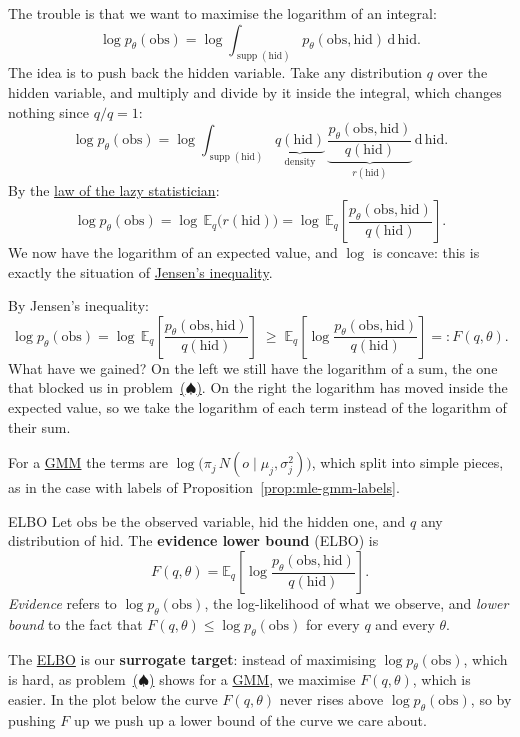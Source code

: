 \documentclass[a4paper,12pt,oneside]{report}
\newcommand{\spadeproblem}{\hyperref[box:spade]{($\spadesuit$)}}
\begin{document}
The trouble is that we want to maximise the logarithm of an integral:
\[
\log p_\theta(\text{obs})=\log\int_{\operatorname{supp}(\text{hid})}
p_\theta(\text{obs},\text{hid})\,\mathrm{d}\,\text{hid}.
\]
The idea is to push back the hidden variable. Take any distribution $q$ over
the hidden variable, and multiply and divide by it inside the integral, which
changes nothing since $q/q=1$:
\[
\log p_\theta(\text{obs})=\log\int_{\operatorname{supp}(\text{hid})}
\underbrace{q(\text{hid})}_{\text{density}}\,
\underbrace{\frac{p_\theta(\text{obs},\text{hid})}{q(\text{hid})}}_{r(\text{hid})}\,
\mathrm{d}\,\text{hid}.
\]
By the \hyperref[thm:lazy]{law of the lazy statistician}:
\[
\log p_\theta(\text{obs})=\log\,\mathbb{E}_q\big(r(\text{hid})\big)
=\log\,\mathbb{E}_q\!\left[\frac{p_\theta(\text{obs},\text{hid})}{q(\text{hid})}\right].
\] We now have the logarithm of an
expected value, and $\log$ is concave: this is exactly the situation of
\hyperref[thm:jensen]{Jensen's inequality}.

By Jensen's inequality:
\[
\log p_\theta(\text{obs})=\log\,\mathbb{E}_q\!\left[\frac{p_\theta(\text{obs},\text{hid})}{q(\text{hid})}\right]
\;\ge\;\mathbb{E}_q\!\left[\log\frac{p_\theta(\text{obs},\text{hid})}{q(\text{hid})}\right]
=:F(q,\theta).
\]
What have we gained? On the left we still have the logarithm of a sum, the
one that blocked us in problem~\spadeproblem. On the right the logarithm has
moved inside the expected value, so we take the logarithm of each term
instead of the logarithm of their sum.

For a \hyperref[def:gmm]{GMM} the
terms are $\log\big(\pi_j\,N(o\mid\mu_j,\sigma_j^2)\big)$, which
split into simple pieces, as in the case with labels of
Proposition~\ref{prop:mle-gmm-labels}.

\begin{frameddefn}{ELBO}\label{def:elbo}
Let $\text{obs}$ be the observed variable, $\text{hid}$ the hidden one, and $q$ any
distribution of $\text{hid}$. The \textbf{evidence lower bound} (ELBO) is
\[
F(q,\theta)=\mathbb{E}_q\!\left[\log\frac{p_\theta(\text{obs},\text{hid})}{q(\text{hid})}\right].
\]
\emph{Evidence} refers to $\log p_\theta(\text{obs})$, the log-likelihood of what we
observe, and \emph{lower bound} to the fact that
$F(q,\theta)\le\log p_\theta(\text{obs})$ for every $q$ and every $\theta$.
\end{frameddefn}

The \hyperref[def:elbo]{ELBO} is our \textbf{surrogate target}: instead of maximising
$\log p_\theta(\text{obs})$, which is hard, as problem~\spadeproblem{} shows for a
\hyperref[def:gmm]{GMM}, we maximise $F(q,\theta)$, which is
easier. In the plot below the curve $F(q,\theta)$ never rises above
$\log p_\theta(\text{obs})$, so by pushing $F$ up we push up a lower bound of the
curve we care about.
\end{document}
